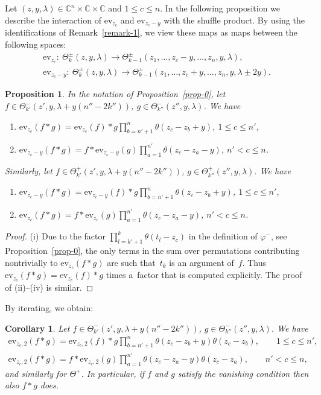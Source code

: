 \documentclass[pdftex]{sigma}
\numberwithin{equation}{section}
\newtheorem{Corollary}[Theorem]{Corollary}
\newtheorem{Proposition}[Theorem]{Proposition}
 { \theoremstyle{definition}
\newtheorem{Definition}[Theorem]{Definition}
\newtheorem{Example}[Theorem]{Example}
\newtheorem{Remark}[Theorem]{Remark} }
\begin{document}
Let $(z,y,\lambda)\in\mathbb C^n\times\mathbb C\times \mathbb C$ and $1\leq c\leq n$. In the following proposition we describe the interaction of $\mathrm{ev}_{z_c}$ and $\mathrm{ev}_{z_c-y}$ with the shuffle product. By using the identifications of Remark~\ref{remark-1}, we view these maps as maps between the following spaces:
\begin{gather*}
 \mathrm{ev}_{z_c} \colon \ \Theta^\pm_k(z,y,\lambda)\to \Theta^\pm_{k-1}(z_1,\dots,z_c-y,\dots,z_n,y,\lambda),\\
 \mathrm{ev}_{z_c-y} \colon \ \Theta^\pm_k(z,y,\lambda)\to \Theta^\pm_{k-1}(z_1,\dots,z_c+y,\dots,z_n,y,\lambda\pm 2y).
\end{gather*}
\begin{Proposition}\label{prop-ev-*} In the notation of Proposition~{\rm \ref{prop-0}}, let $f\in\Theta^-_{k'}(z',y,\lambda+y(n''-2k''))$, $g\in \Theta^-_{k''}(z'',y,\lambda)$. We have
\begin{enumerate}\itemsep=0pt
\item[$(i)$] $ \mathrm{ev}_{z_c}(f*g)= \mathrm{ev}_{z_c}(f)*g \prod\limits_{b=n'+1}^n\theta(z_c-z_b+y)$, $1\leq c\leq n'$,
\item[$(ii)$] $\mathrm{ev}_{z_c-y}(f*g)= f*\mathrm{ev}_{z_c-y}(g) \prod\limits_{a=1}^{n'}\theta(z_c-z_a-y)$, $n'<c\leq n$.
\end{enumerate}
Similarly, let $f\in\Theta^+_{k'}(z',y,\lambda+y(n''-2k''))$, $g\in \Theta^+_{k''}(z'',y,\lambda)$. We have
\begin{enumerate}\itemsep=0pt
\item[$(iii)$] $ \mathrm{ev}_{z_c-y}(f*g)= \mathrm{ev}_{z_c-y}(f)*g \prod\limits_{b=n'+1}^n\theta(z_c-z_b+y)$, $1\leq c\leq n'$,
\item[$(iv)$] $ \mathrm{ev}_{z_c}(f*g)= f*\mathrm{ev}_{z_c}(g) \prod\limits_{a=1}^{n'}\theta(z_c-z_a-y)$, $n'<c\leq n$.
\end{enumerate}
\end{Proposition}
\begin{proof} (i) Due to the factor $\prod\limits_{l=k'+1}^k\theta(t_l-z_c)$ in the definition of $\varphi^-$, see Proposition~\ref{prop-0}, the only terms in the sum over permutations contributing nontrivially to $\mathrm{ev}_{z_c}(f*g)$ are such that~$t_k$ is an argument of~$f$. Thus $\mathrm{ev}_{z_c}(f*g)=\mathrm{ev}_{z_c}(f)*g$ times a~factor that is computed explicitly. The proof of (ii)--(iv) is similar.
\end{proof}

By iterating, we obtain:
\begin{Corollary}\label{cor-3} Let $f\in\Theta^-_{k'}(z',y,\lambda+y(n''-2k''))$, $g\in \Theta^-_{k''}(z'',y,\lambda)$. We have
 \begin{gather*}
 \mathrm{ev}_{z_c,2}(f*g)= \mathrm{ev}_{z_c,2}(f)*g \prod_{b=n'+1}^n\theta(z_c-z_b+y)\theta(z_c-z_b), \qquad 1\leq c\leq n', \\
 \mathrm{ev}_{z_c,2}(f*g) = f*\mathrm{ev}_{z_c,2}(g) \prod_{a=1}^{n'}\theta(z_c-z_a-y)\theta(z_c-z_a), \qquad n'<c\leq n,
 \end{gather*}
 and similarly for $\Theta^+$.
 In particular, if $f$ and $g$ satisfy the vanishing condition then
 also $f*g$ does.
\end{Corollary}
\end{document}
